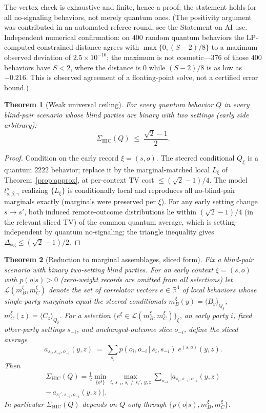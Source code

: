 \documentclass[10pt,twocolumn]{article}
\newtheorem{theorem}{Theorem}
\newcommand{\Sig}{\Sigma_{\mathrm{HIC}}}
\newcommand{\Dsig}{\Delta_{\mathrm{sig}}}
\begin{document}
The vertex check is exhaustive and finite, hence a proof; the statement holds for all no-signaling behaviors, not merely quantum ones. (The positivity argument was contributed in an automated referee round; see the Statement on AI use. Independent numerical confirmation: on $400$ random quantum behaviors the LP-computed constrained distance agrees with $\max\{0,(S-2)/8\}$ to a maximum observed deviation of $2.5\times10^{-16}$; the maximum is not cosmetic---$376$ of those $400$ behaviors have $S<2$, where the distance is $0$ while $(S-2)/8$ is as low as $-0.216$. This is observed agreement of a floating-point solve, not a certified error bound.)

\begin{theorem}[Weak universal ceiling]
\label{thm:weak}
For every quantum behavior $Q$ in every blind-pair scenario whose blind parties are binary with two settings (early side arbitrary):
\begin{equation}
\Sig(Q) \;\le\; \frac{\sqrt2-1}{2}.
\end{equation}
\end{theorem}

\begin{proof}
Condition on the early record $\xi=(s,o)$. The steered conditional $Q_\xi$ is a quantum $2222$ behavior; replace it by the marginal-matched local $L_\xi$ of Theorem~\ref{prop:approx}, at per-context TV cost $\le(\sqrt2-1)/4$. The model $t^s_{o,\beta,\gamma}$ realizing $\{L_\xi\}$ is conditionally local and reproduces all no-blind-pair marginals exactly (marginals were preserved per $\xi$). For any early setting change $s\to s'$, both induced remote-outcome distributions lie within $(\sqrt2-1)/4$ (in the relevant sliced TV) of the common quantum average, which is setting-independent by quantum no-signaling; the triangle inequality gives $\Dsig \le (\sqrt2-1)/2$.
\end{proof}

\begin{theorem}[Reduction to marginal assemblages, sliced form]
\label{thm:reduction}
Fix a blind-pair scenario with binary two-setting blind parties. For an early context $\xi=(s,o)$ with $p(o|s)>0$ (zero-weight records are omitted from all selections) let $\mathcal L(m_B^\xi,m_C^\xi)$ denote the set of correlator vectors $e\in\mathbb R^{4}$ of \emph{local} behaviors whose single-party marginals equal the steered conditionals $m_B^\xi(y)=\langle B_y\rangle_{Q_\xi}$, $m_C^\xi(z)=\langle C_z\rangle_{Q_\xi}$. For a selection $\{e^{\xi}\in\mathcal L(m_B^\xi,m_C^\xi)\}_\xi$, an early party $i$, fixed other-party settings $s_{-i}$, and unchanged-outcome slice $o_{-i}$, define the sliced average
\[
a_{s_i,s_{-i},o_{-i}}(y,z) \;=\; \sum_{o_i} p(o_i,o_{-i}\,|\,s_i,s_{-i})\; e^{(s,o)}(y,z).
\]
Then
\begin{align}
\Sig(Q) = \tfrac12 \min_{\{e^{\xi}\}} \max_{i,\,s_{-i},\,s_i\ne s_i',\,y,z} \sum_{o_{-i}} \big| a_{s_i,s_{-i},o_{-i}}(y,z) \nonumber\\
 - \,a_{s_i',s_{-i},o_{-i}}(y,z) \big|.
\label{eq:reduction}
\end{align}
In particular $\Sig(Q)$ depends on $Q$ only through $\{p(o|s), m_B^\xi, m_C^\xi\}$.
\end{theorem}
\end{document}
